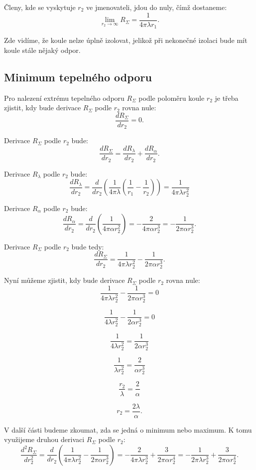 \documentclass{article}
\begin{document}
Členy, kde se vyskytuje $r_2$ ve jmenovateli, jdou do nuly, čímž dostaneme:
$$
    \lim_{r_2 \to \infty} R_\Sigma = \frac{1}{4 \pi \lambda r_1}.
$$

Zde vidíme, že koule nelze úplně izolovat, jelikož při nekonečné izolaci bude mít koule stále nějaký odpor.


\subsection{Minimum tepelného odporu}

Pro nalezení extrému tepelného odporu $R_\Sigma$ podle poloměru koule $r_2$ je třeba zjistit, kdy bude derivace $R_\Sigma$ podle $r_2$ rovna nule:
$$
    \frac{dR_\Sigma}{dr_2} = 0.
$$

Derivace $R_\Sigma$ podle $r_2$ bude:
$$
    \frac{dR_\Sigma}{dr_2} = \frac{dR_\lambda}{dr_2} + \frac{dR_\alpha}{dr_2}.
$$

Derivace $R_\lambda$ podle $r_2$ bude:
$$
    \frac{dR_\lambda}{dr_2} = \frac{d}{dr_2} \left( \frac{1}{4 \pi \lambda} \left( \frac{1}{r_1} - \frac{1}{r_2} \right) \right) = \frac{1}{4 \pi \lambda r_2^2}
$$

Derivace $R_\alpha$ podle $r_2$ bude:
$$
    \frac{dR_\alpha}{dr_2} = \frac{d}{dr_2} \left( \frac{1}{4 \pi \alpha r_2^2} \right) = -\frac{2}{4 \pi \alpha r_2^3} = -\frac{1}{2 \pi \alpha r_2^3}.
$$

Derivace $R_\Sigma$ podle $r_2$ bude tedy:
$$
    \frac{dR_\Sigma}{dr_2} = \frac{1}{4 \pi \lambda r_2^2} - \frac{1}{2 \pi \alpha r_2^3}.
$$

Nyní můžeme zjistit, kdy bude derivace $R_\Sigma$ podle $r_2$ rovna nule:
$$
    \frac{1}{4 \pi \lambda r_2^2} - \frac{1}{2 \pi \alpha r_2^3} = 0
$$

$$
    \frac{1}{4 \lambda r_2^2} - \frac{1}{2 \alpha r_2^3} = 0
$$

$$
    \frac{1}{4 \lambda r_2^2} = \frac{1}{2 \alpha r_2^3}
$$

$$
    \frac{1}{\lambda r_2^2} = \frac{2}{\alpha r_2^3}
$$

$$
    \frac{r_2}{\lambda} = \frac{2}{\alpha}
$$

$$
    r_2 = \frac{2 \lambda}{\alpha}.
$$

V další části budeme zkoumat, zda se jedná o minimum nebo maximum. K tomu využijeme druhou derivaci $R_\Sigma$ podle $r_2$:
$$
    \frac{d^2R_\Sigma}{dr_2^2} = \frac{d}{dr_2} \left( \frac{1}{4 \pi \lambda r_2^2} - \frac{1}{2 \pi \alpha r_2^3} \right) = -\frac{2}{4 \pi \lambda r_2^3} + \frac{3}{2 \pi \alpha r_2^4} = - \frac{1}{2 \pi \lambda r_2^3} + \frac{3}{2 \pi \alpha r_2^4}.
$$
\end{document}
